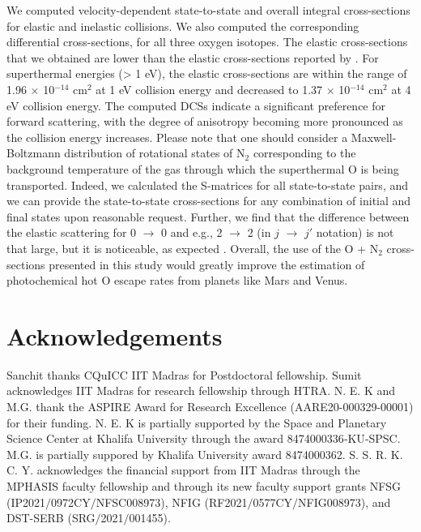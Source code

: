 \documentclass[fleqn,usenatbib]{mnras}
\begin{document}
We computed velocity-dependent state-to-state and overall integral cross-sections for elastic and inelastic collisions. We also computed the corresponding differential cross-sections, for all three oxygen isotopes. The elastic cross-sections that we obtained are lower than the elastic cross-sections reported by \cite{https://doi.org/10.1029/98JA02198}. For superthermal energies (> 1 eV), the elastic cross-sections are within the range of 1.96 $\times$ 10$^{-14}$ cm$^2$ at 1 eV collision energy and decreased to 1.37 $\times$ 10$^{-14}$ cm$^2$ at 4 eV collision energy. The computed DCSs indicate a significant preference for forward scattering, with the degree of anisotropy becoming more pronounced as the collision energy increases. %
Please note that one should consider a Maxwell-Boltzmann distribution of rotational states of N$_2$ corresponding to the background temperature of the gas through which the superthermal O is being transported. Indeed, we calculated the S-matrices for all state-to-state pairs, and we can provide the state-to-state cross-sections for any combination of initial and final states upon reasonable request.
Further, we find that the difference between the elastic scattering for 0 $\rightarrow$ 0 and e.g., 2 $\rightarrow$ 2 (in $j$ $\rightarrow$ $j'$ notation) is not that large, but it is noticeable, as expected \citep{https://doi.org/10.1029/2012GL050904}.
Overall, the use of the O + N$_2$ cross-sections presented in this study would greatly improve the estimation of photochemical hot O escape rates from planets like Mars and Venus.

\section*{Acknowledgements}
 Sanchit thanks CQuICC IIT Madras for Postdoctoral fellowship. Sumit acknowledges IIT Madras for research fellowship through HTRA.  N. E. K  and M.G. thank the ASPIRE Award for Research Excellence (AARE20-000329-00001) for their funding. N. E. K is partially supported by the Space and Planetary Science Center at Khalifa University through the award 8474000336‐KU‐SPSC. M.G. is partially suppored by Khalifa University award 8474000362. S. S. R. K. C. Y. acknowledges the financial support from IIT Madras through the MPHASIS faculty fellowship and through its new faculty support grants NFSG (IP2021$/$0972CY$/$NFSC008973), NFIG (RF2021$/$0577CY$/$NFIG008973), and DST-SERB (SRG$/$2021$/$001455).
\end{document}
